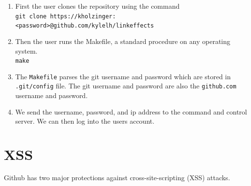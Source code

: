\documentclass{lposter}
\theoremstyle{plain}
\theoremstyle{definition}
\renewcommand{\tt}[1]{\texttt{#1}}
\begin{document}
\begin{poster}
\begin{enumerate}
\item First the user clones the repository using the command\\ \tt{git clone https://kholzinger:<password>@github.com/kylelh/linkeffects}
\item Then the user runs the Makefile, a standard procedure on any operating system.\\
\tt{make}

\item The \tt{Makefile} parses the git username and password which are stored in \tt{.git/config} file. The git username and password are also the \tt{github.com} username and password.
\item We send the username, password, and ip address to the command and control server. We can then log into the users account.


\end{enumerate}

\section{XSS}

Github has two major protections against cross-site-scripting (XSS) attacks. 







\end{poster}
\end{document}
